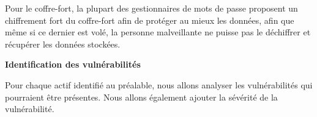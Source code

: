 Pour le coffre-fort, la plupart des gestionnaires de mots de passe proposent un chiffrement fort du coffre-fort afin de protéger au mieux les données, afin que même si ce dernier est volé, la personne malveillante ne puisse pas le déchiffrer et récupérer les données stockées.

\textbf{Identification des vulnérabilités}

Pour chaque actif identifié au préalable, nous allons analyser les vulnérabilités qui pourraient être présentes. Nous allons également ajouter la sévérité de la vulnérabilité. 

\begin{table}[H]
	\centering
\end{table}
